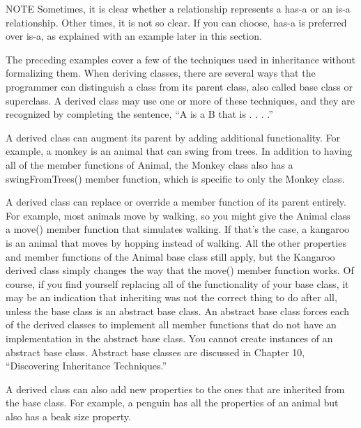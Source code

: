 \begin{myNotic}{NOTE}
Sometimes, it is clear whether a relationship represents a has-a or an is-a relationship. Other times, it is not so clear. If you can choose, has-a is preferred over is-a, as explained with an example later in this section.
\end{myNotic}


The preceding examples cover a few of the techniques used in inheritance without formalizing them. When deriving classes, there are several ways that the programmer can distinguish a class from its parent class, also called base class or superclass. A derived class may use one or more of these techniques, and they are recognized by completing the sentence, “A is a B that is . . . .”


A derived class can augment its parent by adding additional functionality. For example, a monkey is an animal that can swing from trees. In addition to having all of the member functions of Animal, the Monkey class also has a swingFromTrees() member function, which is specific to only the Monkey class.



A derived class can replace or override a member function of its parent entirely. For example, most animals move by walking, so you might give the Animal class a move() member function that simulates walking. If that’s the case, a kangaroo is an animal that moves by hopping instead of walking. All the other properties and member functions of the Animal base class still apply, but the Kangaroo derived class simply changes the way that the move() member function works. Of course, if you find yourself replacing all of the functionality of your base class, it may be an indication that inheriting was not the correct thing to do after all, unless the base class is an abstract base class. An abstract base class forces each of the derived classes to implement all member functions that do not have an implementation in the abstract base class. You cannot create instances of an abstract base class. Abstract base classes are discussed in Chapter 10, “Discovering Inheritance Techniques.”


A derived class can also add new properties to the ones that are inherited from the base class. For example, a penguin has all the properties of an animal but also has a beak size property.

